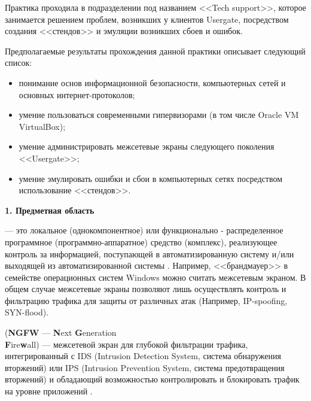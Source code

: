 Практика проходила в подразделении под названием <<Tech support>>, которое занимается решением проблем, возникших у клиентов Usergate, посредством создания <<стендов>> и эмуляции возникших сбоев и ошибок.
		
Предполагаемые результаты прохождения данной практики описывает следующий список:

\begin{itemize}[nosep]
	\item понимание основ информационной безопасности, компьютерных сетей и основных интернет-протоколов;
				
	\item умение пользоваться современными гипервизорами (в том числе Oracle VM VirtualBox);
			
	\item умение администрировать межсетевые экраны следующего поколения\\<<Usergate>>;
			
	\item умение эмулировать ошибки и сбои в компьютерных сетях посредством использование <<стендов>>.
\end{itemize}

\newpage

\begin{center}
	\textbf{\Large 1. Предметная область}
\end{center}

 --- это локальное (однокомпонентное) или функционально - распределенное программное (программно-аппаратное) средство (комплекс), реализующее контроль за информацией, поступающей в автоматизированную систему и/или выходящей из автоматизированной системы \cite{fw}. Например, <<брандмауер>> в семействе операционных систем Windows можно считать межсетевым экраном. В общем случае межсетевые экраны позволяют лишь осуществлять контроль и фильтрацию трафика для защиты от различных атак (Например, IP-spoofing, SYN-flood).
		
 (\textbf{NGFW} --- \textbf{N}ext \textbf{G}eneration \\\textbf{F}ire\textbf{w}all) --- межсетевой экран для глубокой фильтрации трафика, интегрированный с IDS (Intrusion Detection System, система обнаружения вторжений) или IPS (Intrusion Prevention System, система предотвращения вторжений) и обладающий возможностью контролировать и блокировать трафик на уровне приложений \cite{ngfw1}.

